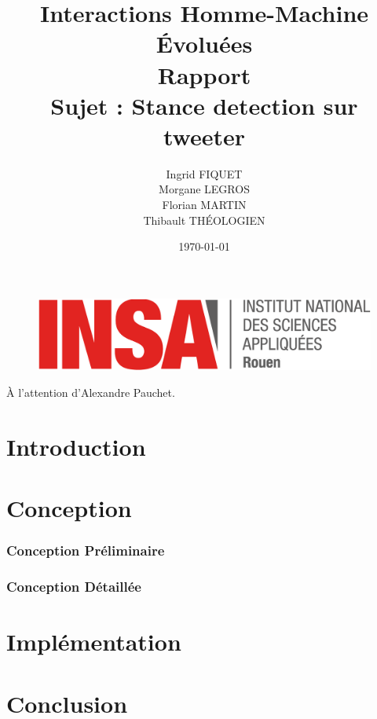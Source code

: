 \documentclass[a4paper,12pt]{article}
\title{\huge Interactions Homme-Machine Évoluées\\Rapport\\Sujet : Stance detection sur tweeter}
\author{Ingrid FIQUET\\Morgane LEGROS\\Florian MARTIN\\Thibault THÉOLOGIEN}
\date{\today}
\begin{document}
	\begin{titlepage}
		\vfill
		\begin{figure}
			\includegraphics[scale=0.3]{img/logoINSARouen.png}
		\end{figure}

		\maketitle
		
		     
    \begin{center} 
    \LARGE
      \addvspace{10mm} 
      À l'attention d'Alexandre Pauchet. 
    \end{center} 

		\vfill
		\noindent \hrulefill

	\end{titlepage}



\newpage
\tableofcontents{}

\newpage
\part{Introduction}
	


\newpage
\part{Conception}

\section{Conception Préliminaire}
	
	
	
\section{Conception Détaillée}
	
	

\newpage
\part{Implémentation}
	

	
\newpage
\part{Conclusion}
	
\end{document}
